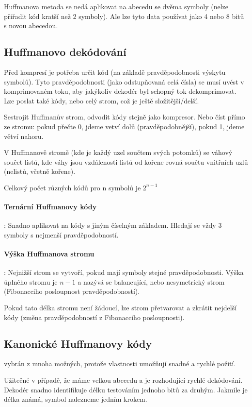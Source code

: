 \documentclass[a4paper, 11pt]{report}
\begin{document}
Huffmanova metoda se nedá aplikovat na abecedu se dvěma symboly (nelze přiřadit kód kratší než 2 symboly). Ale lze tyto data používat jako 4 nebo 8 bitů s novou abecedou.

\subsection{Huffmanovo dekódování}
Před kompresí je potřeba určit kód (na základě pravděpodobnosti výskytu symbolů). Tyto pravděpodobnosti (jako odstupňovaná celá čísla) se musí uvést v komprimovaném toku, aby jakýkoliv dekodér byl schopný tok dekomprimovat. Lze poslat také kódy, nebo celý strom, což je ještě složitější/delší.

Sestrojit Huffmanův strom, odvodit kódy stejně jako kompresor. Nebo číst přímo ze stromu: pokud přečte 0, jdeme vetví dolů (pravděpodobnější), pokud 1, jdeme větví nahoru.

V Huffmanově stromě (kde je každý uzel součtem svých potomků) se váhový součet listů, kde váhy jsou vzdálenosti listů od kořene rovná součtu vnitřních uzlů (nelistů, včetně kořene).

Celkový počet různých kódů pro n symbolů je $2^{n-1}$

\paragraph{Ternární Huffmanovy kódy}: Snadno aplikovat na kódy s jiným číselným základem. Hledají se vždy 3 symboly s nejmenší pravděpodobností.

\paragraph{Výška Huffmanova stromu}: Nejnižší strom se vytvoří, pokud mají symboly stejné pravděpodobnosti. Výška úplného stromu je $n-1$ a nazývá se balancující, nebo nesymetrický strom (Fibonacciho posloupnost pravděpodobností).

Pokud tato délka stromu není žádoucí, lze strom přetvarovat a zkrátit nejdelší kódy (změna pravděpodobností z Fibonacciho posloupnosti).

\subsection{Kanonické Huffmanovy kódy}
vybrán z mnoha možných, protože vlastnosti umožňují snadné a rychlé požití.

Užitečné v případě, že máme velkou abecedu a je rozhodující rychlé dekódování. Dekodér snadno identifikuje délku testováním jednoho bitů za druhým. Jakmile je délka známá, symbol nalezneme jedním krokem.
\end{document}
